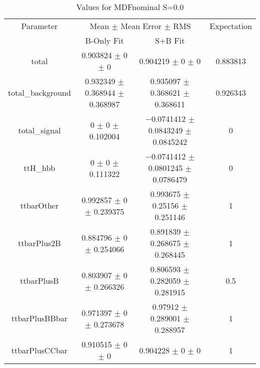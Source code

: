 \begin{table}
\centering
\caption{Values for MDFnominal S=0.0}
\begin{tabular}{cccc}
\toprule
Parameter & \multicolumn{2}{c}{Mean $\pm$ Mean Error $\pm$ RMS} & Expectation\\
 & B-Only Fit & S+B Fit & \\
\midrule
total & \num{0.903824} $\pm$ \num{0} $\pm$ \num{0} & \num{0.904219} $\pm$ \num{0} $\pm$ \num{0} & \num{0.883813}\\
total\_background & \num{0.932349} $\pm$ \num{0.368944} $\pm$ \num{0.368987} & \num{0.935097} $\pm$ \num{0.368621} $\pm$ \num{0.368611} & \num{0.926343}\\
total\_signal & \num{0} $\pm$ \num{0} $\pm$ \num{0.102004} & \num{-0.0741412} $\pm$ \num{0.0843249} $\pm$ \num{0.0845242} & \num{0}\\
ttH\_hbb & \num{0} $\pm$ \num{0} $\pm$ \num{0.111322} & \num{-0.0741412} $\pm$ \num{0.0801245} $\pm$ \num{0.0786479} & \num{0}\\
ttbarOther & \num{0.992857} $\pm$ \num{0} $\pm$ \num{0.239375} & \num{0.993675} $\pm$ \num{0.25156} $\pm$ \num{0.251146} & \num{1}\\
ttbarPlus2B & \num{0.884796} $\pm$ \num{0} $\pm$ \num{0.254066} & \num{0.891839} $\pm$ \num{0.268675} $\pm$ \num{0.268445} & \num{1}\\
ttbarPlusB & \num{0.803907} $\pm$ \num{0} $\pm$ \num{0.266326} & \num{0.806593} $\pm$ \num{0.282059} $\pm$ \num{0.281915} & \num{0.5}\\
ttbarPlusBBbar & \num{0.971397} $\pm$ \num{0} $\pm$ \num{0.273678} & \num{0.97912} $\pm$ \num{0.289001} $\pm$ \num{0.288957} & \num{1}\\
ttbarPlusCCbar & \num{0.910515} $\pm$ \num{0} $\pm$ \num{0} & \num{0.904228} $\pm$ \num{0} $\pm$ \num{0} & \num{1}\\
\bottomrule
\end{tabular}
\end{table}